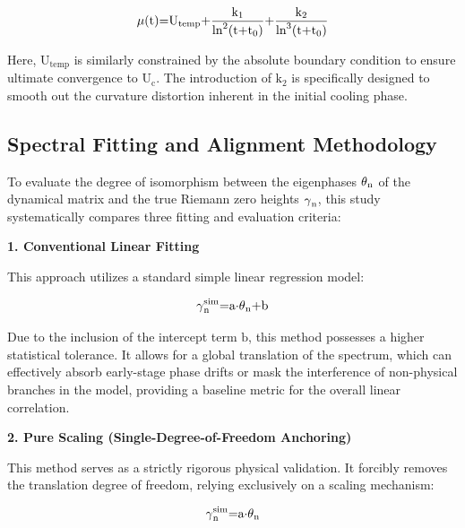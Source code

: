 \documentclass[fleqn,10pt]{wlscirep}
\begin{document}
\[\text{\ensuremath{\mu}}\text{(}\text{t}\text{)=}\text{U}_{\text{temp}}\text{+}\frac{\text{k}_{\text{1}}}{\text{ln}^{\text{2}}\text{(}\text{t}\text{+}\text{t}_{\text{0}}\text{)}}\text{+}\frac{\text{k}_{\text{2}}}{\text{ln}^{\text{3}}\text{(}\text{t}\text{+}\text{t}_{\text{0}}\text{)}}\]

Here, \(\text{U}_{\text{temp}}\) is similarly constrained by the
absolute boundary condition to ensure ultimate convergence to
\(\text{U}_{\text{c}}\). The introduction of \(\text{k}_{\text{2}}\) is
specifically designed to smooth out the curvature distortion inherent in
the initial cooling phase.

\subsection*{Spectral Fitting and Alignment Methodology}

To evaluate the degree of isomorphism between the eigenphases
\(\text{\ensuremath{\theta}}_{\text{n}}\) of the dynamical matrix and the true Riemann
zero heights \(\text{\ensuremath{\gamma}}_{\text{n}}\), this study systematically compares
three fitting and evaluation criteria:

\textbf{1. Conventional Linear Fitting}

This approach utilizes a standard simple linear regression model:

\[\text{\ensuremath{\gamma}}_{\text{n}}^{\text{sim}}\text{=}\text{a}\text{\ensuremath{\cdot}}\text{\ensuremath{\theta}}_{\text{n}}\text{+}\text{b}\]

Due to the inclusion of the intercept term \(\text{b}\), this method
possesses a higher statistical tolerance. It allows for a global
translation of the spectrum, which can effectively absorb early-stage
phase drifts or mask the interference of non-physical branches in the
model, providing a baseline metric for the overall linear correlation.

\textbf{2. Pure Scaling (Single-Degree-of-Freedom Anchoring)}

This method serves as a strictly rigorous physical validation. It
forcibly removes the translation degree of freedom, relying exclusively
on a scaling mechanism:

\[\text{\ensuremath{\gamma}}_{\text{n}}^{\text{sim}}\text{=}\text{a}\text{\ensuremath{\cdot}}\text{\ensuremath{\theta}}_{\text{n}}\]
\end{document}
